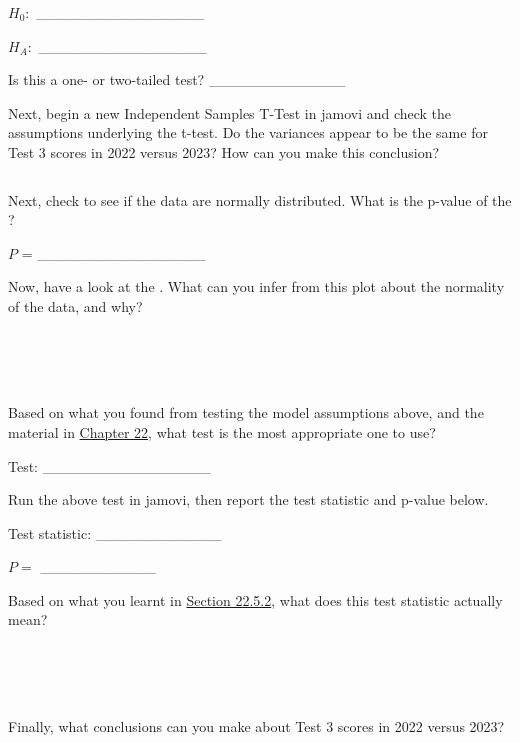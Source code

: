 \documentclass[
  openany]{krantz}
\begin{document}
\(H_{0}:\) \_\_\_\_\_\_\_\_\_\_\_\_\_\_\_\_

\(H_{A}:\) \_\_\_\_\_\_\_\_\_\_\_\_\_\_\_\_

Is this a one- or two-tailed test? \_\_\_\_\_\_\_\_\_\_\_\_\_

Next, begin a new Independent Samples T-Test in jamovi and check the assumptions underlying the t-test.
Do the variances appear to be the same for Test 3 scores in 2022 versus 2023?
How can you make this conclusion?

\begin{verbatim}

\end{verbatim}

Next, check to see if the data are normally distributed.
What is the p-value of the ?

\(P\) = \_\_\_\_\_\_\_\_\_\_\_\_\_\_\_\_

Now, have a look at the .
What can you infer from this plot about the normality of the data, and why?

\begin{verbatim}




\end{verbatim}

Based on what you found from testing the model assumptions above, and the material in \protect\hyperlink{Chapter_22}{Chapter 22}, what test is the most appropriate one to use?

Test: \_\_\_\_\_\_\_\_\_\_\_\_\_\_\_\_

Run the above test in jamovi, then report the test statistic and p-value below.

Test statistic: \_\_\_\_\_\_\_\_\_\_\_\_

\(P =\) \_\_\_\_\_\_\_\_\_\_\_

Based on what you learnt in \protect\hyperlink{mann-whitney-u-test}{Section 22.5.2}, what does this test statistic actually mean?

\begin{verbatim}




\end{verbatim}

Finally, what conclusions can you make about Test 3 scores in 2022 versus 2023?

\begin{verbatim}




\end{verbatim}
\end{document}
